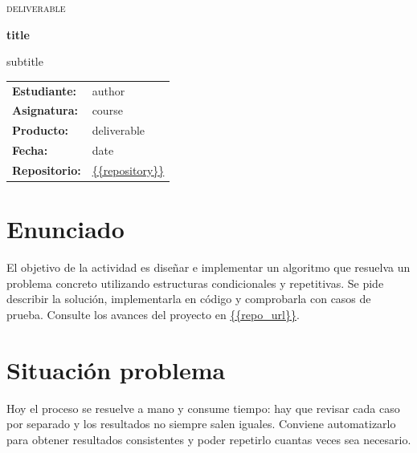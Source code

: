 \documentclass[12pt]{article}
\begin{document}
  \begin{titlepage}
    \centering
    {\scshape\LARGE {{deliverable}} \par}
    \vspace{1.2cm}
    {\huge\bfseries {{title}} \par}
    \vspace{0.5cm}
    {\Large {{subtitle}} \par}
    \vspace{1.6cm}
    \begin{tcolorbox}[colback=blue!3, colframe=blue!35!black, width=0.88\textwidth]
      \begin{tabular}{@{}ll@{}}
        \textbf{Estudiante:} & {{author}} \\
        \textbf{Asignatura:} & {{course}} \\
        \textbf{Producto:} & {{deliverable}} \\
        \textbf{Fecha:} & {{date}} \\
        \textbf{Repositorio:} & {\small\url{{{repository}}}} \\
      \end{tabular}
    \end{tcolorbox}
    \vfill
  \end{titlepage}

  \section{Enunciado}
  El objetivo de la actividad es diseñar e implementar un algoritmo que
  resuelva un problema concreto utilizando estructuras condicionales y
  repetitivas. Se pide describir la solución, implementarla en código y
  comprobarla con casos de prueba. Consulte los avances del proyecto en
  \url{{{repo_url}}}.

  \section{Situación problema}
  Hoy el proceso se resuelve a mano y consume tiempo: hay que revisar cada
  caso por separado y los resultados no siempre salen iguales. Conviene
  automatizarlo para obtener resultados consistentes y poder repetirlo
  cuantas veces sea necesario.
\end{document}

